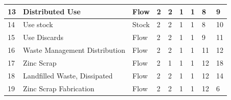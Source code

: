 \documentclass[ %
                    author={Tom Jager},
                supervisor={Dr. Daniel Schien},
                    degree={MEng},
                     title={A Bayesian Inference Engine for Calibrating Uncertainty over UMIS Structured MFA Systems},
                  subtitle={},
                      type={research},
                      year={2019} ]{dissertation}
\begin{document}
\begin{table}[]
\begin{tabular}{|p{1.1cm}|p{2cm}|p{1.5cm}|p{1.5cm}|p{1.5cm}|p{1.5cm}|p{1.5cm}|p{1.6cm}|p{1.5cm}|}
13                      & Distributed Use                           & Flow                                   & 2                                           & 2                                                & 1                                   & 1                                                & 8                                  & 9                                       \\ \hline
14                      & Use stock                                 & Stock                                  & 2                                           & 2                                                & 1                                   & 1                                                & 8                                  & 10                                      \\ \hline
15                      & Use Discards                              & Flow                                   & 2                                           & 2                                                & 1                                   & 1                                                & 9                                  & 11                                      \\ \hline
16                      & Waste Management Distribution             & Flow                                   & 2                                           & 2                                                & 1                                   & 1                                                & 11                                 & 12                                      \\ \hline
17                      & Zinc Scrap                                & Flow                                   & 2                                           & 1                                                & 1                                   & 1                                                & 12                                 & 18                                      \\ \hline
18                      & Landfilled Waste, Dissipated              & Flow                                   & 2                                           & 2                                                & 1                                   & 1                                                & 12                                 & 14                                      \\ \hline
19                      & Zinc Scrap Fabrication                    & Flow                                   & 2                                           & 2                                                & 1                                   & 1                                                & 12                                 & 6                                       \\ \hline

\end{tabular}
\end{table}
\end{document}
